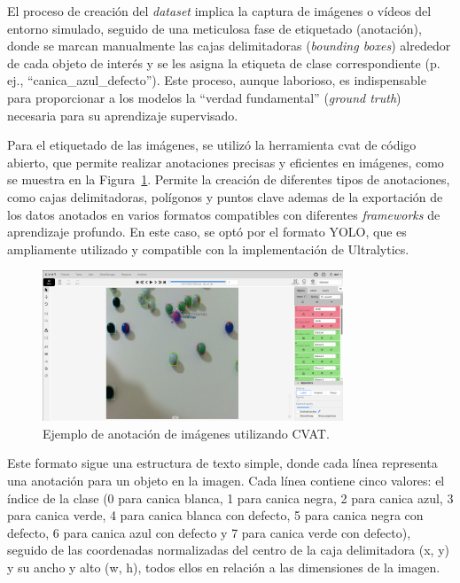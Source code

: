 \documentclass[11pt,spanish,listoffigures,listoftables]{tfgetsinf}
\begin{document}
El proceso de creación del \textit{dataset} implica la captura de imágenes o vídeos del entorno simulado, seguido de una meticulosa fase de etiquetado (anotación), donde se marcan manualmente las cajas delimitadoras (\textit{bounding boxes}) alrededor de cada objeto de interés y se les asigna la etiqueta de clase correspondiente (p. ej., ``canica\_azul\_defecto''). Este proceso, aunque laborioso, es indispensable para proporcionar a los modelos la ``verdad fundamental'' (\textit{ground truth}) necesaria para su aprendizaje supervisado.

Para el etiquetado de las imágenes, se utilizó la herramienta \gls{cvat}\cite{CVAT_ai_Corporation_Computer_Vision_Annotation_2023} de código abierto, que permite realizar anotaciones precisas y eficientes en imágenes, como se muestra en la Figura~\ref{fig:cvat_anotacion}. Permite la creación de diferentes tipos de anotaciones, como cajas delimitadoras, polígonos y puntos clave ademas de la exportación de los datos anotados en varios formatos compatibles con diferentes \textit{frameworks} de aprendizaje profundo. En este caso, se optó por el formato YOLO, que es ampliamente utilizado y compatible con la implementación de Ultralytics.

\begin{figure}[H]
   \centering
   \includegraphics[width=0.8\textwidth]{images/diseno_e_implementacion/ejemplo_CVAT.png}
   \caption[Ejemplo de anotación de imágenes utilizando CVAT]{Ejemplo de anotación de imágenes utilizando CVAT.}
   \label{fig:cvat_anotacion}
\end{figure}


Este formato sigue una estructura de texto simple, donde cada línea representa una anotación para un objeto en la imagen. Cada línea contiene cinco valores: el índice de la clase (0 para canica blanca, 1 para canica negra, 2 para canica azul, 3 para canica verde, 4 para canica blanca con defecto, 5 para canica negra con defecto, 6 para canica azul con defecto y 7 para canica verde con defecto), seguido de las coordenadas normalizadas del centro de la caja delimitadora (x, y) y su ancho y alto (w, h), todos ellos en relación a las dimensiones de la imagen.
\end{document}

